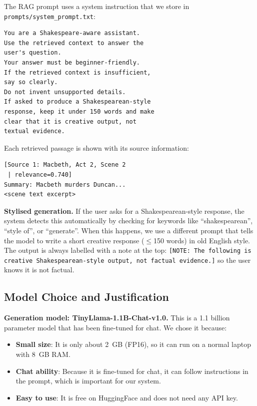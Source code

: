 \documentclass[10pt,conference]{IEEEtran}
\begin{document}
The RAG prompt uses a system instruction that we store in \texttt{prompts/system\_prompt.txt}:

\begin{lstlisting}[language={}]
You are a Shakespeare-aware assistant.
Use the retrieved context to answer the
user's question.
Your answer must be beginner-friendly.
If the retrieved context is insufficient,
say so clearly.
Do not invent unsupported details.
If asked to produce a Shakespearean-style
response, keep it under 150 words and make
clear that it is creative output, not
textual evidence.
\end{lstlisting}

Each retrieved passage is shown with its source information:

\begin{lstlisting}[language={}]
[Source 1: Macbeth, Act 2, Scene 2
 | relevance=0.740]
Summary: Macbeth murders Duncan...
<scene text excerpt>
\end{lstlisting}

\textbf{Stylised generation.} If the user asks for a Shakespearean-style response, the system detects this automatically by checking for keywords like ``shakespearean'', ``style of'', or ``generate''. When this happens, we use a different prompt that tells the model to write a short creative response ($\leq$150 words) in old English style. The output is always labelled with a note at the top: \texttt{[NOTE: The following is creative Shakespearean-style output, not factual evidence.]} so the user knows it is not factual.

\subsection{Model Choice and Justification}

\textbf{Generation model: TinyLlama-1.1B-Chat-v1.0.} This is a 1.1 billion parameter model that has been fine-tuned for chat. We chose it because:
\begin{itemize}
    \item \textbf{Small size}: It is only about 2~GB (FP16), so it can run on a normal laptop with 8~GB RAM.
    \item \textbf{Chat ability}: Because it is fine-tuned for chat, it can follow instructions in the prompt, which is important for our system.
    \item \textbf{Easy to use}: It is free on HuggingFace and does not need any API key.
\end{itemize}
\end{document}
